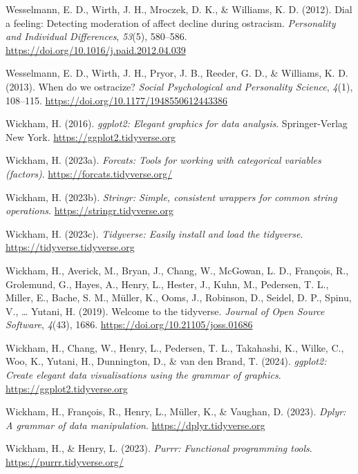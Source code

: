 \documentclass[
]{udthesis}
\newlength{\cslhangindent}
\newenvironment{CSLReferences}[2] %
 {\begin{list}{}{%
  \setlength{\itemindent}{0pt}
  \setlength{\leftmargin}{0pt}
  \setlength{\parsep}{0pt}
  \ifodd #1
   \setlength{\leftmargin}{\cslhangindent}
   \setlength{\itemindent}{-1\cslhangindent}
  \fi
  \setlength{\itemsep}{#2\baselineskip}}}
 {\end{list}}
\begin{document}
\begin{CSLReferences}{1}{0}
Wesselmann, E. D., Wirth, J. H., Mroczek, D. K., \& Williams, K. D. (2012). Dial a feeling: Detecting moderation of affect decline during ostracism. \emph{Personality and Individual Differences}, \emph{53}(5), 580--586. \url{https://doi.org/10.1016/j.paid.2012.04.039}

Wesselmann, E. D., Wirth, J. H., Pryor, J. B., Reeder, G. D., \& Williams, K. D. (2013). When do we ostracize? \emph{Social Psychological and Personality Science}, \emph{4}(1), 108--115. \url{https://doi.org/10.1177/1948550612443386}

Wickham, H. (2016). \emph{ggplot2: Elegant graphics for data analysis}. Springer-Verlag New York. \url{https://ggplot2.tidyverse.org}

Wickham, H. (2023a). \emph{Forcats: Tools for working with categorical variables (factors)}. \url{https://forcats.tidyverse.org/}

Wickham, H. (2023b). \emph{Stringr: Simple, consistent wrappers for common string operations}. \url{https://stringr.tidyverse.org}

Wickham, H. (2023c). \emph{Tidyverse: Easily install and load the tidyverse}. \url{https://tidyverse.tidyverse.org}

Wickham, H., Averick, M., Bryan, J., Chang, W., McGowan, L. D., François, R., Grolemund, G., Hayes, A., Henry, L., Hester, J., Kuhn, M., Pedersen, T. L., Miller, E., Bache, S. M., Müller, K., Ooms, J., Robinson, D., Seidel, D. P., Spinu, V., \ldots{} Yutani, H. (2019). Welcome to the {tidyverse}. \emph{Journal of Open Source Software}, \emph{4}(43), 1686. \url{https://doi.org/10.21105/joss.01686}

Wickham, H., Chang, W., Henry, L., Pedersen, T. L., Takahashi, K., Wilke, C., Woo, K., Yutani, H., Dunnington, D., \& van den Brand, T. (2024). \emph{ggplot2: Create elegant data visualisations using the grammar of graphics}. \url{https://ggplot2.tidyverse.org}

Wickham, H., François, R., Henry, L., Müller, K., \& Vaughan, D. (2023). \emph{Dplyr: A grammar of data manipulation}. \url{https://dplyr.tidyverse.org}

Wickham, H., \& Henry, L. (2023). \emph{Purrr: Functional programming tools}. \url{https://purrr.tidyverse.org/}


\end{CSLReferences}
\end{document}
